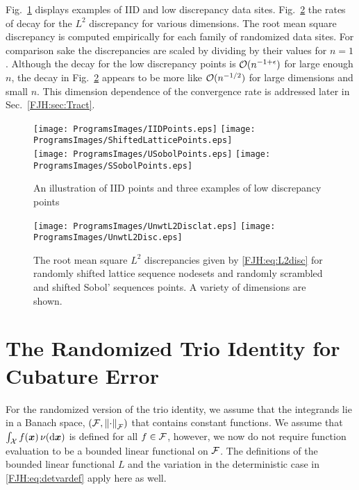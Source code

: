 \documentclass[graybox,footinfo]{svmult}
\begin{document}
Fig.\ \ref{FJH:fig:plotsdiffpts} displays examples of IID and low discrepancy data sites.  
Fig.\ \ref{FJH:fig:unwtdiscdiffpts} the rates of decay for the $L^2$ discrepancy for 
various dimensions.  The root mean square discrepancy is computed 
empirically for each family of randomized data sites.    For comparison sake the 
discrepancies are scaled by 
dividing by their values for $n=1$.  Although the 
decay for the low discrepancy points is 
$\mathcal{O}(n^{-1+\epsilon})$ for large enough $n$, the decay in Fig.\ 
\ref{FJH:fig:unwtdiscdiffpts} appears to be 
more like $\mathcal{O}(n^{-1/2})$ for large dimensions and small $n$.   This dimension 
dependence of the convergence rate is addressed later in Sec.\  \ref{FJH:sec:Tract}. 


\begin{FJHLesson}
	\FJHLessonTwo
\end{FJHLesson}


\begin{figure}
	\centering
	\texttt{[image: ProgramsImages/IIDPoints.eps]} \qquad
	\texttt{[image: ProgramsImages/ShiftedLatticePoints.eps]} \\
	\texttt{[image: ProgramsImages/USobolPoints.eps]} \qquad
	\texttt{[image: ProgramsImages/SSobolPoints.eps]}
	\caption{An illustration of IID points and three examples of low discrepancy points 
	\label{FJH:fig:plotsdiffpts}}
\end{figure}

\begin{figure}
	\centering
	  \texttt{[image: ProgramsImages/UnwtL2Disclat.eps]}   
	  \qquad 
	  \texttt{[image: ProgramsImages/UnwtL2Disc.eps]} 
	\caption{The root mean square $L^2$ discrepancies given by \eqref{FJH:eq:L2disc} 
	for randomly shifted 
	lattice sequence nodesets and randomly scrambled and shifted Sobol' sequences 
	points.  A variety of dimensions are shown.
		\label{FJH:fig:unwtdiscdiffpts}}
\end{figure}

\section{The Randomized Trio Identity for Cubature Error} \label{FJH:sec:rndtrio}
For the randomized version of the trio identity, we assume that the integrands lie in 
a Banach space, $(\mathcal{F},\left \lVert \cdot \right \rVert_{\mathcal{F}})$ that contains 
constant functions.  We assume
that $\int_{\mathcal{X}} f({\boldsymbol{x}}) \, \nu(\mathrm{d}{\boldsymbol{x}})$ is defined  for all $f \in \mathcal{F}$, however, we now do 
not require 
function evaluation to be a bounded linear functional on $\mathcal{F}$.  The definitions of the 
bounded linear functional $L$ and the variation in the deterministic case in  
\eqref{FJH:eq:detvardef} apply here as well.
\end{document}
